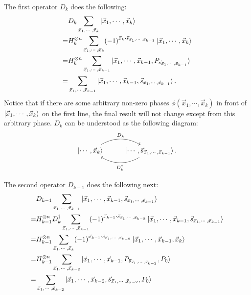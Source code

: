 \documentclass{article}
\begin{document}
The first operator $D_k$ does the following:
\begin{align}
  & D_k \sum_{\vec{x}_1,\cdots,\vec{x}_k} \ket{\vec{x}_1,\cdots,\vec{x}_k}\nonumber\\ 
  = & H^{\otimes n}_k \sum_{\vec{x}_1,\cdots,\vec{x}_k}
  (-1)^{\vec{x}_k\vdot\vec{s}_{\vec{x}_1,\cdots,\vec{x}_{k-1}}} 
  \ket{\vec{x}_1,\cdots,\vec{x}_k} \\
  = & H_k^{\otimes n} \sum_{\vec{x}_1,\cdots,\vec{x}_{k-1}}
  \ket{\vec{x}_1,\cdots,\vec{x}_{k-1},P_{\vec{s}_{\vec{x}_1,\cdots,\vec{x}_{k-1}}}}
  \\
  = & \sum_{\vec{x}_1,\cdots,\vec{x}_{k-1}}
  \ket{\vec{x}_1,\cdots,\vec{x}_{k-1},\vec{s}_{\vec{x}_1,\cdots,\vec{x}_{k-1}}}.
\end{align}
Notice that if there are some arbitrary non-zero phases
$\phi(\vec{x}_1,\cdots,\vec{x}_k)$ in front of
$\ket{\vec{x}_1,\cdots,\vec{x}_k}$ on the first line, the final result will not
change except from this arbitrary phase. $D_k$ can be understood as the following
diagram:
\begin{equation}
\begin{tikzcd}
  \ket{\cdots,\vec{x}_k} \arrow[r, bend left, "D_k"] & 
   \arrow[l, bend left, "D^\dagger_k"] 
   \ket{\cdots,\vec{s}_{\vec{x}_1,\cdots,\vec{x}_{k-1}}}.
\end{tikzcd}
\end{equation}

The second operator $D_{k-1}$ does the following next:
\begin{align}
  & D_{k-1} \sum_{\vec{x}_1,\cdots,\vec{x}_{k-1}}
  \ket{\vec{x}_1,\cdots,\vec{x}_{k-1},\vec{s}_{\vec{x}_1,\cdots,\vec{x}_{k-1}}}
  \\
  =& H^{\otimes n}_{k-1} D^\dagger_k \sum_{\vec{x}_1,\cdots,\vec{x}_{k-1}} 
  (-1)^{\vec{x}_{k-1}\vdot \vec{s}_{\vec{x}_1,\cdots,\vec{x}_{k-2}}}
  \ket{\vec{x}_1,\cdots,\vec{x}_{k-1},\vec{s}_{\vec{x}_1,\cdots,\vec{x}_{k-1}}}
  \\
  =& H^{\otimes n}_{k-1} \sum_{\vec{x}_1,\cdots,\vec{x}_{k}}
  (-1)^{\vec{x}_{k-1}\vdot \vec{s}_{\vec{x}_1,\cdots,\vec{x}_{k-2}}}
  \ket{\vec{x}_1,\cdots,\vec{x}_{k-1},\vec{x}_{k}}
  \\
  =& H^{\otimes n}_{k-1} \sum_{\vec{x}_1,\cdots,\vec{x}_{k-2}}
  \ket{\vec{x}_1,\cdots,\vec{x}_{k-1},
  P_{\vec{s}_{\vec{x}_1,\cdots,\vec{x}_{k-2}}},P_0}
  \\
  =& \sum_{\vec{x}_1,\cdots,\vec{x}_{k-2}}
  \ket{\vec{x}_1,\cdots,\vec{x}_{k-2}, \vec{s}_{\vec{x}_1,\cdots,\vec{x}_{k-2}},P_0}
\end{align}
\end{document}
